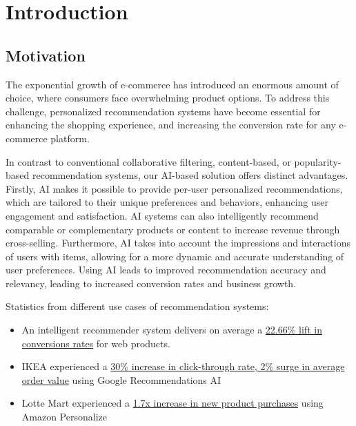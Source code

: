 \chapter{Introduction}
\minitoc

\section{Motivation}

The exponential growth of e-commerce has introduced an enormous amount of choice, where consumers face overwhelming product options. To address this challenge, personalized recommendation systems have become essential for enhancing the shopping experience, and increasing the conversion rate for any e-commerce platform.

In contrast to conventional collaborative filtering\cite{NvidiaRecSys}, content-based\cite{NvidiaRecSys}, or popularity-based recommendation systems, our AI-based solution offers distinct advantages. Firstly, AI makes it possible to provide per-user personalized recommendations, which are tailored to their unique preferences and behaviors, enhancing user engagement and satisfaction. AI systems can also intelligently recommend comparable or complementary products or content to increase revenue through cross-selling. Furthermore, AI takes into account the impressions and interactions of users with items, allowing for a more dynamic and accurate understanding of user preferences. Using AI leads to improved recommendation accuracy and relevancy, leading to increased conversion rates and business growth.
    




Statistics from different use cases of recommendation systems:

\begin{itemize}
    \item An intelligent recommender system delivers on average a \underline{22.66\% lift in conversions rates} \cite{salesforce2014predictive} for web products.
    \item IKEA experienced a \underline{30\% increase in click-through rate, 2\% surge in average order value} \cite{IkeaRecAtGoogleCloudSummit}  using Google Recommendations AI \cite{GoogleRecommendationsAI}
    \item Lotte Mart experienced a \underline{1.7x increase in new product purchases} \cite{LotteMartAwsPersonalize} using Amazon Personalize \cite{AWSPersonalize}
\end{itemize}

